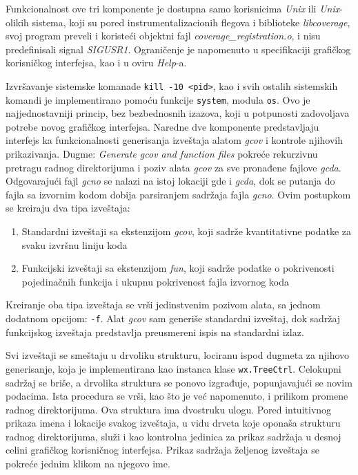 \documentclass[12pt,oneside]{memoir}
\newcommand{\kod}[1]{\texttt{#1}}
\newcommand{\strano}[1]{\textit{#1}}
\begin{document}
Funkcionalnost ove tri komponente je dostupna samo korisnicima \strano{Unix} ili \strano{Unix}-olikih sistema, koji su pored instrumentalizacionih flegova i biblioteke \strano{libcoverage}, svoj program preveli i koristeći objektni fajl \strano{coverage\_registration.o}, i nisu predefinisali signal \strano{SIGUSR1}. Ograničenje je napomenuto u specifikaciji grafičkog korisničkog interfejsa, kao i u oviru \strano{Help}-a. 

Izvršavanje sistemske komanade \kod{kill -10 <pid>}, kao i svih ostalih sistemskih komandi je implementirano pomoću funkcije \kod{system}, modula \kod{os}. Ovo je najjednostavniji princip, bez bezbednosnih izazova, koji u potpunosti zadovoljava potrebe novog grafičkog interfejsa. Naredne dve komponente predstavljaju interfejs ka funkcionalnosti generisanja izveštaja alatom \strano{gcov} i kontrole njihovih prikazivanja. Dugme: \strano{Generate gcov and function files} pokreće rekurzivnu pretragu radnog direktorijuma i poziv alata \strano{gcov} za sve pronađene fajlove \strano{gcda}. Odgovarajući fajl \strano{gcno} se nalazi na istoj lokaciji gde i \strano{gcda}, dok se putanja do fajla sa izvornim kodom dobija parsiranjem sadržaja fajla \strano{gcno}. Ovim postupkom se kreiraju dva tipa izveštaja: 
\begin{enumerate}
\item Standardni izveštaji sa ekstenzijom \strano{gcov}, koji sadrže kvantitativne podatke za svaku izvršnu liniju koda
\item Funkcijski izveštaji sa ekstenzijom \strano{fun}, koji sadrže podatke o pokrivenosti pojedinačnih funkcija i ukupnu pokrivenost fajla izvornog koda
\end{enumerate}
Kreiranje oba tipa izveštaja se vrši jedinstvenim pozivom alata, sa jednom dodatnom opcijom: \kod{-f}. Alat \strano{gcov} sam generiše standardni izveštaj, dok sadržaj funkcijskog izveštaja predstavlja preusmereni ispis na standardni izlaz. 

Svi izveštaji se smeštaju u drvoliku strukturu, lociranu ispod dugmeta za njihovo generisanje, koja je implementirana kao instanca klase \kod{wx.TreeCtrl}. Celokupni sadržaj se briše, a drvolika struktura se ponovo izgrađuje, popunjavajući se novim podacima. Ista procedura se vrši, kao što je već napomenuto, i prilikom promene radnog direktorijuma. Ova struktura ima dvostruku ulogu. Pored intuitivnog prikaza imena i lokacije svakog izveštaja, u vidu drveta koje oponaša strukturu radnog direktorijuma, služi i kao kontrolna jedinica za prikaz sadržaja u desnoj celini grafičkog korisničnog interfejsa. Prikaz sadržaja željenog izveštaja se pokreće jednim klikom na njegovo ime. 
\end{document}
